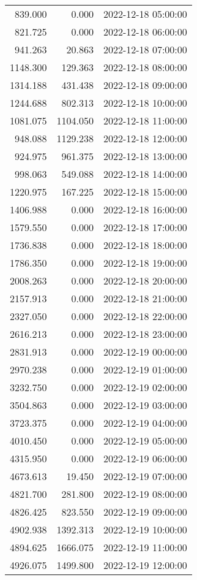 \documentclass[
]{article}
\begin{document}
\begin{longtable}[]{@{}rrl@{}}
839.000 & 0.000 & 2022-12-18 05:00:00 \\
821.725 & 0.000 & 2022-12-18 06:00:00 \\
941.263 & 20.863 & 2022-12-18 07:00:00 \\
1148.300 & 129.363 & 2022-12-18 08:00:00 \\
1314.188 & 431.438 & 2022-12-18 09:00:00 \\
1244.688 & 802.313 & 2022-12-18 10:00:00 \\
1081.075 & 1104.050 & 2022-12-18 11:00:00 \\
948.088 & 1129.238 & 2022-12-18 12:00:00 \\
924.975 & 961.375 & 2022-12-18 13:00:00 \\
998.063 & 549.088 & 2022-12-18 14:00:00 \\
1220.975 & 167.225 & 2022-12-18 15:00:00 \\
1406.988 & 0.000 & 2022-12-18 16:00:00 \\
1579.550 & 0.000 & 2022-12-18 17:00:00 \\
1736.838 & 0.000 & 2022-12-18 18:00:00 \\
1786.350 & 0.000 & 2022-12-18 19:00:00 \\
2008.263 & 0.000 & 2022-12-18 20:00:00 \\
2157.913 & 0.000 & 2022-12-18 21:00:00 \\
2327.050 & 0.000 & 2022-12-18 22:00:00 \\
2616.213 & 0.000 & 2022-12-18 23:00:00 \\
2831.913 & 0.000 & 2022-12-19 00:00:00 \\
2970.238 & 0.000 & 2022-12-19 01:00:00 \\
3232.750 & 0.000 & 2022-12-19 02:00:00 \\
3504.863 & 0.000 & 2022-12-19 03:00:00 \\
3723.375 & 0.000 & 2022-12-19 04:00:00 \\
4010.450 & 0.000 & 2022-12-19 05:00:00 \\
4315.950 & 0.000 & 2022-12-19 06:00:00 \\
4673.613 & 19.450 & 2022-12-19 07:00:00 \\
4821.700 & 281.800 & 2022-12-19 08:00:00 \\
4826.425 & 823.550 & 2022-12-19 09:00:00 \\
4902.938 & 1392.313 & 2022-12-19 10:00:00 \\
4894.625 & 1666.075 & 2022-12-19 11:00:00 \\
4926.075 & 1499.800 & 2022-12-19 12:00:00 \\

\end{longtable}
\end{document}
